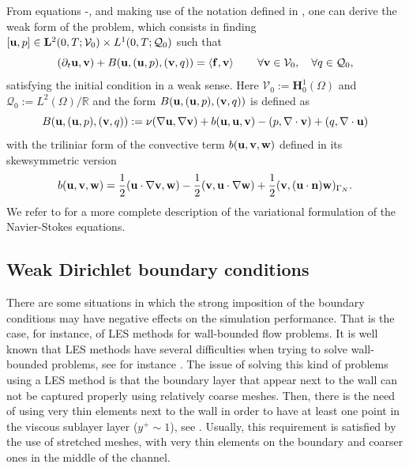 From equations -, and making use of the notation defined in , one can derive the weak form of the problem, which consists in finding \hfil \\$[{\bf u},p]\in\mathbf{L}^2(0,T; \mathcal{V}_0)\times L^1(0,T; \mathcal{Q}_0)$ such that
\begin{equation}
\label{eq-C7_NS_weak}
(\partial_t{\bf u},{\bf v})+B({\bf u},({\bf u},p),({\bf v},q)) = \left<{\bf f},{\bf v}\right> 
\quad\quad\forall{\bf v}\in\mathcal{V}_0,\quad\forall q\in\mathcal{Q}_0,
\end{equation}
satisfying the initial condition  in a weak sense. Here $\mathcal{V}_0:=\mathbf{H}_0^1(\Omega)$ and $\mathcal{Q}_0:=L^2(\Omega)/\mathbb{R}$ and the form $B({\bf u},({\bf u},p),({\bf v},q))$ is defined as 
\begin{equation}
\label{eq-C7_bilinear}
B({\bf u},({\bf u},p),({\bf v},q)):=\nu(\nabla{\bf u},\nabla{\bf v})+b({\bf u},{\bf u},{\bf v})-(p,\nabla\cdot{\bf v})+(q,\nabla\cdot{\bf u})
\end{equation}
with the triliniar form of the convective term $b({\bf u},{\bf v},{\bf w})$ defined in its skewsymmetric version
\begin{equation}
\label{eq-C7_conv_skew}
b({\bf u},{\bf v},{\bf w})=\frac{1}{2}({\bf u}\cdot\nabla{\bf v},{\bf w})-\frac{1}{2}({\bf v},{\bf u}\cdot\nabla{\bf w})+\frac{1}{2}({\bf v},({\bf u}\cdot\mathbf{n}){\bf w})_{\Gamma_N}.
\end{equation}
We refer to  for a more complete description of the variational formulation of the Navier-Stokes equations.

\subsection{Weak Dirichlet boundary conditions}
\label{subsec-C7_weak_bcs}
There are some situations in which the strong imposition of the boundary conditions may have negative effects on the simulation performance. That is the case, for instance, of LES methods for wall-bounded flow problems. It is well known that LES methods have several difficulties when trying to solve wall-bounded problems, see for instance \cite{spalart_strategies_2000,spalart1997comments}. The issue of solving this kind of problems using a LES method is that the boundary layer that appear next to the wall can not be captured properly using relatively coarse meshes. Then, there is the need of using very thin elements next to the wall in order to have at least one point in the viscous sublayer layer ($ y^+\sim1 $), see \cite{pope_turbulent_2000}. Usually, this requirement is satisfied by the use of stretched meshes, with very thin elements on the boundary and coarser ones in the middle of the channel.

